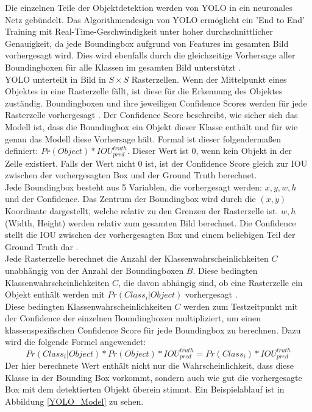{{	Die einzelnen Teile der Objektdetektion werden von YOLO in ein neuronales Netz gebündelt. Das Algorithmendesign von YOLO ermöglicht ein 'End to End' Training mit Real-Time-Geschwindigkeit unter hoher durchschnittlicher Genauigkeit, da jede Boundingbox aufgrund von Features im gesamten Bild vorhergesagt wird. Dies wird ebenfalls durch die gleichzeitige Vorhersage aller Boundingboxen für alle Klassen im gesamten Bild unterstützt \citep{Redmon2016}. \\
	YOLO unterteilt in Bild in $S \times S $ Rasterzellen. Wenn der Mittelpunkt eines Objektes in eine Rasterzelle fällt, ist diese für die Erkennung des Objektes zuständig. Boundingboxen und ihre jeweiligen Confidence Scores werden für jede Rasterzelle vorhergesagt \citep{Redmon2016}.
	Der Confidence Score beschreibt, wie sicher sich das Modell ist, dass die Boundingbox ein Objekt dieser Klasse enthält und für wie genau das Modell diese Vorhersage hält. Formal ist dieser folgendermaßen definiert:  $Pr (Object) * IOU^{truth}_{pred}$. Dieser Wert ist 0, wenn kein Objekt in der Zelle existiert. Falls der Wert nicht 0 ist, ist der Confidence Score gleich zur IOU zwischen der vorhergesagten Box und der Ground Truth berechnet. \\
	Jede Boundingbox besteht aus 5 Variablen, die vorhergesagt werden: $x, y, w, h$ und der Confidence. Das Zentrum der Boundingbox wird durch die $(x, y)$ Koordinate dargestellt, welche relativ zu den Grenzen der Rasterzelle ist. $w, h$ (Width, Height) werden relativ zum gesamten Bild berechnet. Die Confidence stellt die IOU zwischen der vorhergesagten Box und einem beliebigen Teil der Ground Truth dar \citep{Redmon2016}. \\
	Jede Rasterzelle berechnet die Anzahl der Klassenwahrscheinlichkeiten $C$ unabhängig von der Anzahl der Boundingboxen $B$. Diese bedingten Klassenwahrscheinlichkeiten $C$, die davon abhängig sind, ob eine Rasterzelle ein Objekt enthält werden mit $Pr(Class_i | Object)$ vorhergesagt \citep{Redmon2016}. \\
	Diese bedingten Klassenwahrscheinlichkeiten $C$ werden zum Testzeitpunkt mit der Confidence der einzelnen Boundingboxen multipliziert, um einen klassenspezifischen Confidence Score für jede Boundingbox zu berechnen. Dazu wird die folgende Formel angewendet: 
	\begin{equation}
	Pr(Class_i|Object) * Pr(Object) * IOU_{pred}^{truth} = Pr(Class_i) * IOU_{pred}^{truth}
	\end{equation}
	Der hier berechnete Wert enthält nicht nur die Wahrscheinlichkeit, dass diese Klasse in der Bounding Box vorkommt, sondern auch wie gut die vorhergesagte Box mit dem detektierten Objekt überein stimmt. Ein Beispielablauf ist in Abbildung \ref{YOLO_Model} zu sehen.
}}
